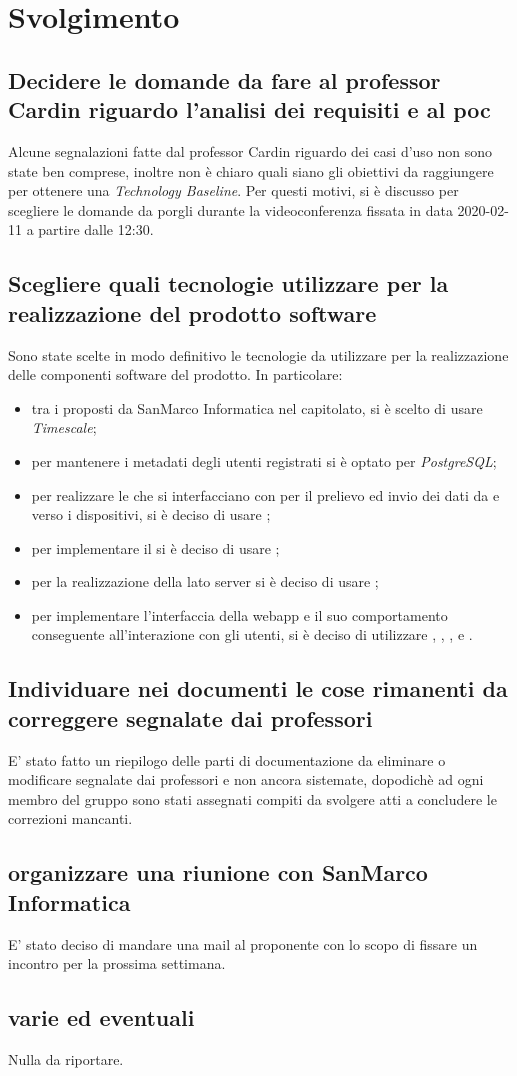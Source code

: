\newpage
\section*{Svolgimento}

	\subsection*{Decidere le domande da fare al professor Cardin riguardo l'analisi dei requisiti e al poc}
		Alcune segnalazioni fatte dal professor Cardin riguardo dei casi d'uso non sono state ben comprese, inoltre non è chiaro quali siano gli obiettivi da raggiungere per ottenere una \textit{Technology Baseline}.  Per questi motivi, si è discusso per scegliere le domande da porgli durante la videoconferenza fissata in data 2020-02-11 a partire dalle 12:30.

	\subsection*{Scegliere quali tecnologie utilizzare per la realizzazione del prodotto software}
		Sono state scelte in modo definitivo le tecnologie da utilizzare per la realizzazione delle componenti software del prodotto. In particolare:
		\begin{itemize}
				\item tra i  proposti da SanMarco Informatica nel capitolato, si è scelto di usare \textit{Timescale};
				\item per mantenere i metadati degli utenti registrati si è optato per \textit{PostgreSQL};
				\item per realizzare le  che si interfacciano con  per il prelievo ed invio dei dati da e verso i dispositivi, si è deciso di usare ;
				\item per implementare il  si è deciso di usare ;
				\item per la realizzazione della  lato server si è deciso di usare ;
				\item per implementare l'interfaccia della webapp e il suo comportamento conseguente all'interazione con gli utenti, si è deciso di utilizzare ,
				, ,  e .
			\end{itemize}

	\subsection*{Individuare nei documenti le cose rimanenti da correggere segnalate dai professori}
		E' stato fatto un riepilogo delle parti di documentazione da eliminare o modificare segnalate dai professori e non ancora sistemate, dopodichè ad ogni membro del gruppo sono stati assegnati compiti da svolgere atti a concludere le correzioni mancanti.

	\subsection*{organizzare una riunione con SanMarco Informatica}
		E' stato deciso di mandare una mail al proponente con lo scopo di fissare un incontro per la prossima settimana.
		\subsection*{varie ed eventuali}
		Nulla da riportare.